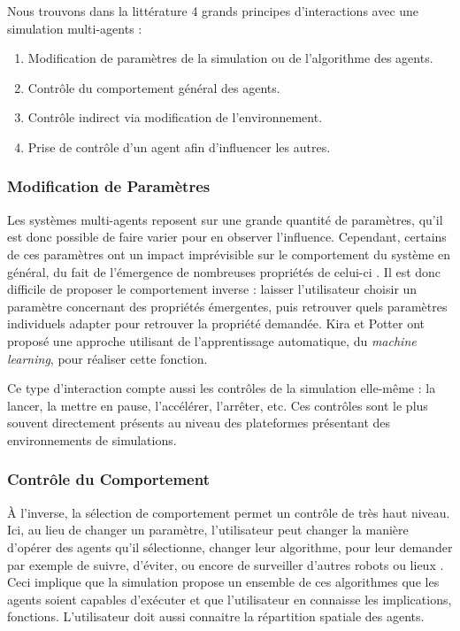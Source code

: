	
		Nous trouvons dans la littérature 4 grands principes d'interactions avec une simulation multi-agents \cite{kolling_human_2016} :
		\begin{enumerate}
			\item Modification de paramètres de la simulation ou de l'algorithme des agents.
			\item Contrôle du comportement général des agents.
			\item Contrôle indirect via modification de l'environnement.
			\item Prise de contrôle d'un agent afin d'influencer les autres.
		\end{enumerate}
		
		
	\subsubsection{Modification de Paramètres}
	Les systèmes multi-agents reposent sur une grande quantité de paramètres, qu'il est donc possible de faire varier pour en observer l'influence. Cependant, certains de ces paramètres ont un impact imprévisible sur le comportement du système en général, du fait de l'émergence de nombreuses propriétés de celui-ci \cite{couzin_collective_2002}. Il est donc difficile de proposer le comportement inverse : laisser l'utilisateur choisir un paramètre concernant des propriétés émergentes, puis retrouver quels paramètres individuels adapter pour retrouver la propriété demandée. Kira et Potter \cite{kira_exerting_2009} ont proposé une approche utilisant de l'apprentissage automatique, du \textit{machine learning}, pour réaliser cette fonction.
	
	Ce type d'interaction compte aussi les contrôles de la simulation elle-même : la lancer, la mettre en pause, l'accélérer, l'arrêter, etc. Ces contrôles sont le plus souvent directement présents au niveau des plateformes présentant des environnements de simulations.
		
	\subsubsection{Contrôle du Comportement}
	À l'inverse, la sélection de comportement permet un contrôle de très haut niveau. Ici, au lieu de changer un paramètre, l'utilisateur peut changer la manière d'opérer des agents qu'il sélectionne, changer leur algorithme, pour leur demander par exemple de suivre, d'éviter, ou encore de surveiller d'autres robots ou lieux \cite{coppin_controlling_2012}. Ceci implique que la simulation propose un ensemble de ces algorithmes que les agents soient capables d'exécuter et que l'utilisateur en connaisse les implications, fonctions. L'utilisateur doit aussi connaitre la répartition spatiale des agents.
	
